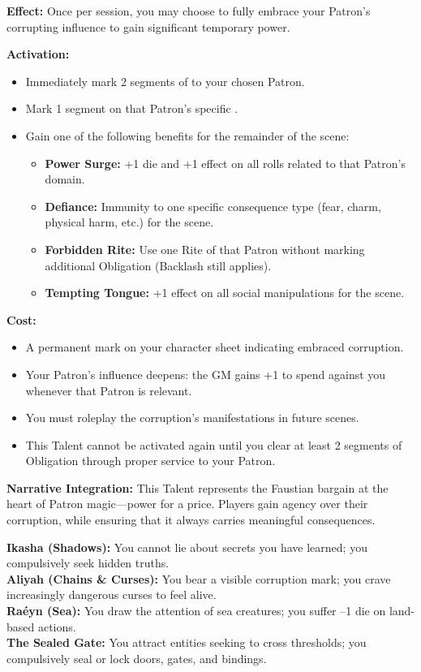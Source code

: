 \textbf{Effect:} Once per session, you may choose to fully embrace your Patron’s corrupting influence to gain significant temporary power.

\textbf{Activation:}
\begin{itemize}
    \item Immediately mark 2 segments of  to your chosen Patron.
    \item Mark 1 segment on that Patron’s specific .
    \item Gain one of the following benefits for the remainder of the scene:
    \begin{itemize}
        \item \textbf{Power Surge:} +1 die and +1 effect on all rolls related to that Patron’s domain.
        \item \textbf{Defiance:} Immunity to one specific consequence type (fear, charm, physical harm, etc.) for the scene.
        \item \textbf{Forbidden Rite:} Use one Rite of that Patron without marking additional Obligation (Backlash still applies).
        \item \textbf{Tempting Tongue:} +1 effect on all social manipulations for the scene.
    \end{itemize}
\end{itemize}

\textbf{Cost:}
\begin{itemize}
    \item A permanent mark on your character sheet indicating embraced corruption.
    \item Your Patron’s influence deepens: the GM gains +1  to spend against you whenever that Patron is relevant.
    \item You must roleplay the corruption’s manifestations in future scenes.
    \item This Talent cannot be activated again until you clear at least 2 segments of Obligation through proper service to your Patron.
\end{itemize}

\textbf{Narrative Integration:} This Talent represents the Faustian bargain at the heart of Patron magic—power for a price. Players gain agency over their corruption, while ensuring that it always carries meaningful consequences.

\begin{tcolorbox}[title=Example Corruptions by Patron]
\textbf{Ikasha (Shadows):} You cannot lie about secrets you have learned; you compulsively seek hidden truths. \\
\textbf{Aliyah (Chains \& Curses):} You bear a visible corruption mark; you crave increasingly dangerous curses to feel alive. \\
\textbf{Raéyn (Sea):} You draw the attention of sea creatures; you suffer --1 die on land-based actions. \\
\textbf{The Sealed Gate:} You attract entities seeking to cross thresholds; you compulsively seal or lock doors, gates, and bindings.
\end{tcolorbox}
